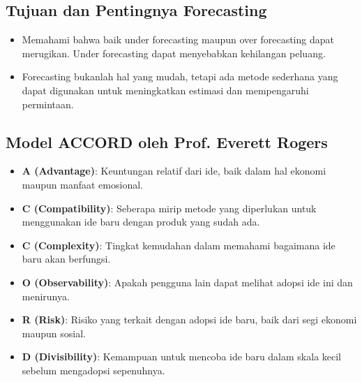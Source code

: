\documentclass{article}
\begin{document}
\subsection{Tujuan dan Pentingnya Forecasting}
\begin{itemize}
    \item Memahami bahwa baik under forecasting maupun over forecasting dapat merugikan. Under forecasting dapat menyebabkan kehilangan peluang.
    \item Forecasting bukanlah hal yang mudah, tetapi ada metode sederhana yang dapat digunakan untuk meningkatkan estimasi dan mempengaruhi permintaan.
\end{itemize}

\subsection{Model ACCORD oleh Prof. Everett Rogers}
\begin{itemize}
    \item \textbf{A (Advantage)}: Keuntungan relatif dari ide, baik dalam hal ekonomi maupun manfaat emosional.
    \item \textbf{C (Compatibility)}: Seberapa mirip metode yang diperlukan untuk menggunakan ide baru dengan produk yang sudah ada.
    \item \textbf{C (Complexity)}: Tingkat kemudahan dalam memahami bagaimana ide baru akan berfungsi.
    \item \textbf{O (Observability)}: Apakah pengguna lain dapat melihat adopsi ide ini dan menirunya.
    \item \textbf{R (Risk)}: Risiko yang terkait dengan adopsi ide baru, baik dari segi ekonomi maupun sosial.
    \item \textbf{D (Divisibility)}: Kemampuan untuk mencoba ide baru dalam skala kecil sebelum mengadopsi sepenuhnya.
\end{itemize}
\end{document}
